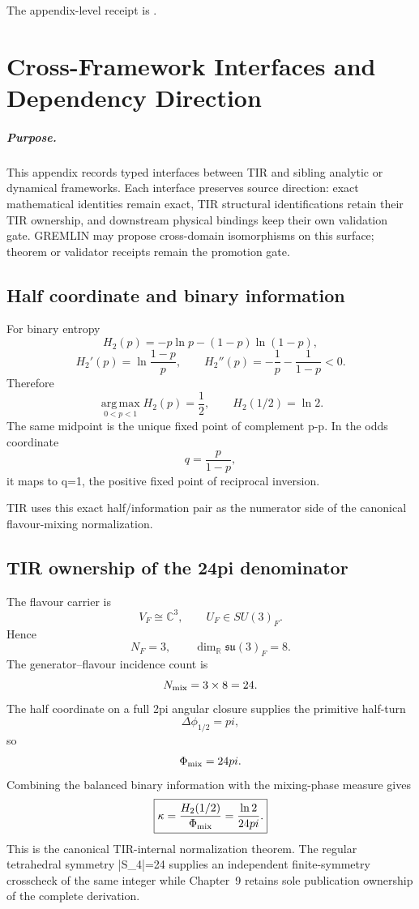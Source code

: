 \documentclass[11pt,a4paper,twoside]{book}
\def\({}%
\def\){}%
\def\pi{pi}%
\theoremstyle{definition}
\begin{document}
The appendix-level receipt is
.

\clearpage

\chapter{Cross-Framework Interfaces and Dependency Direction}
\label{app:v12_cross_framework}

\paragraph{Purpose.}
This appendix records typed interfaces between TIR and sibling analytic or
dynamical frameworks.  Each interface preserves source direction: exact
mathematical identities remain exact, TIR structural identifications retain
their TIR ownership, and downstream physical bindings keep their own validation
gate.  GREMLIN may propose cross-domain isomorphisms on this surface; theorem or
validator receipts remain the promotion gate.

\section{Half coordinate and binary information}

For binary entropy
\[
H_2(p)=-p\ln p-(1-p)\ln(1-p),
\]
\[
H_2'(p)=\ln\frac{1-p}{p},
\qquad
H_2''(p)=-\frac1p-\frac1{1-p}<0.
\]
Therefore
\[
\boxed{
\operatorname*{arg\,max}_{0<p<1}H_2(p)=\frac12,
\qquad
H_2(1/2)=\ln2.
}
\]
The same midpoint is the unique fixed point of complement \(p-p\).
In the odds coordinate
\[
q=\frac{p}{1-p},
\]
it maps to \(q=1\), the positive fixed point of reciprocal inversion.

TIR uses this exact half/information pair as the numerator side of the canonical
flavour-mixing normalization.

\section{TIR ownership of the \(24\pi\) denominator}

The flavour carrier is
\[
V_F\cong\mathbb C^3,
\qquad
U_F\in SU(3)_F.
\]
Hence
\[
N_F=3,\qquad
\dim_{\mathbb R}\mathfrak{su}(3)_F=8.
\]
The generator--flavour incidence count is
\[
N_{\rm mix}=3\times8=24.
\]
The half coordinate on a full \(2\pi\) angular closure supplies the primitive
half-turn
\[
\Delta\phi_{1/2}=\pi,
\]
so
\[
\Phi_{\rm mix}=24\pi.
\]
Combining the balanced binary information with the mixing-phase measure gives
\[
\boxed{
\kappa
=\frac{H_2(1/2)}{\Phi_{\rm mix}}
=\frac{\ln2}{24\pi}.
}
\]
This is the canonical TIR-internal normalization theorem.  The regular
tetrahedral symmetry \(|S_4|=24\) supplies an independent finite-symmetry
crosscheck of the same integer while Chapter~9 retains sole publication
ownership of the complete derivation.
\end{document}
